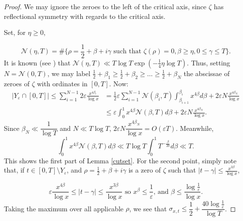 \documentclass{article}
\newcommand{\1}{\mathds{1}}
\numberwithin{equation}{section}
\newcommand{\eps}{\varepsilon}
\renewcommand{\leq}{\leqslant}
\renewcommand{\geq}{\geqslant}
\theoremstyle{plain} %
\newcommand{\Hf}{\dfrac{1}{2}}
\newcommand{\hf}{\frac{1}{2}}
\begin{document}
\begin{proof}
    We may ignore the zeroes to the left of the critical axis, since $\zeta$ has reflectional symmetry with regards to the critical axis.
    
    Set, for $\eta \geq 0$,

    \begin{equation}
        \mathcal{N}(\eta, T) = \# \{ \rho = \Hf + \beta + i \gamma \text{ such that } \zeta(\rho) = 0, \beta \geq \eta, 0 \leq \gamma \leq T \}.
    \end{equation}
    It is known (see \cite{Sel1946}) that $ \mathcal{N}(\eta, T) \ll T \log T \exp(-\frac{1}{4} \eta \log T)$. Thus, setting $N = \mathcal{N}(0, T)$, we may label $\hf + \beta_1 \geq \hf + \beta_2 \geq \ldots \geq \hf + \beta_N$ the abscissae of zeroes of $\zeta$ with ordinates in $[0, T]$. Now:
    \begin{equation}
    \begin{split}
            |Y_\eps \cap [0, T]|  \leq \sum_{i = 1}^{N - 1} 2 \eps \frac{x^{4 \beta_i}}{\log x}
  & = \frac{1}{2} \eps \sum_{i=1}^{N-1} \mathcal{N}(\beta_i, T)\int_{\beta_{i+1}}^{\beta_i} x^{4 \beta} d\beta + 2 \eps N \frac{x^{4 \beta_N}}{\log x}
  \\
  & \leq \eps \int_0^{1} x^{4 \beta} \mathcal{N}(\beta, T) d\beta + 2 \eps N \frac{x^{4 \beta_N}}{\log x}.
  \end{split}
    \end{equation}
   Since $\beta_N \ll \dfrac{1}{\log T}$ and $N \ll T \log T$, $2 \eps N \dfrac{x^{4 \beta_N}}{\log x} = O(\eps T)$. Meanwhile,
    \begin{equation}
            \int_0^{1} x^{4 \beta} \mathcal{N}(\beta, T) d\beta  \ll T \log T\int_0^1 T^{-\frac{\beta}{20}} d \beta 
             \ll T.
    \end{equation}
    This shows the first part of Lemma \ref{cutset}. For the second point, simply note that, if $t \in [0, T] \setminus Y_{\eps}$, and $\rho = \hf + \beta + i \gamma$ is a zero of $\zeta$ such that $|t - \gamma| \leq \frac{x^{3 \beta}}{\log x}$,

    \begin{equation}
        \eps \frac{x^{4 \beta}}{\log x} \leq |t - \gamma| \leq \frac{x^{3 \beta}}{\log x} \text{ so } x^{\beta} \leq \frac{1}{\eps} \text{, and } \beta \leq \frac{\log \frac{1}{\eps}}{\log x}.
    \end{equation}
    Taking the maximum over all applicable $\rho$, we see that $\sigma_{x, t} \leq \Hf + \dfrac{40 \log \frac{1}{\eps}}{\log T}$.
\end{proof}
\end{document}
